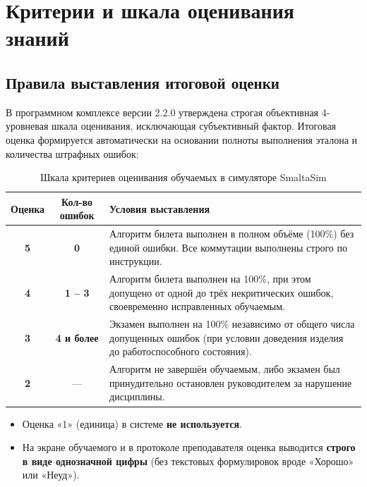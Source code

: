 \documentclass[12pt,a4paper]{report}
\begin{document}
\chapter{Критерии и шкала оценивания знаний}

\section{Правила выставления итоговой оценки}
В программном комплексе версии 2.2.0 утверждена строгая объективная 4-уровневая шкала оценивания, исключающая субъективный фактор. Итоговая оценка формируется автоматически на основании полноты выполнения эталона и количества штрафных ошибок:

\begin{table}[H]
    \centering
    \begin{tabularx}{\textwidth}{ccX}
        \toprule
        \textbf{Оценка} & \textbf{Кол-во ошибок} & \textbf{Условия выставления} \\
        \midrule
        \textbf{\Huge 5} & \textbf{0} & Алгоритм билета выполнен в полном объёме (100\%) без единой ошибки. Все коммутации выполнены строго по инструкции. \\
        \addlinespace
        \textbf{\Huge 4} & \textbf{1 -- 3} & Алгоритм билета выполнен на 100\%, при этом допущено от одной до трёх некритических ошибок, своевременно исправленных обучаемым. \\
        \addlinespace
        \textbf{\Huge 3} & \textbf{4 и более} & Экзамен выполнен на 100\% независимо от общего числа допущенных ошибок (при условии доведения изделия до работоспособного состояния). \\
        \addlinespace
        \textbf{\Huge 2} & --- & Алгоритм не завершён обучаемым, либо экзамен был принудительно остановлен руководителем за нарушение дисциплины. \\
        \bottomrule
    \end{tabularx}
    \caption{Шкала критериев оценивания обучаемых в симуляторе SmaltaSim}
\end{table}

\begin{infoNote}
    \begin{itemize}
        \item Оценка «1» (единица) в системе \textbf{не используется}.
        \item На экране обучаемого и в протоколе преподавателя оценка выводится \textbf{строго в виде однозначной цифры} (без текстовых формулировок вроде «Хорошо» или «Неуд»).
    \end{itemize}
\end{infoNote}
\end{document}
